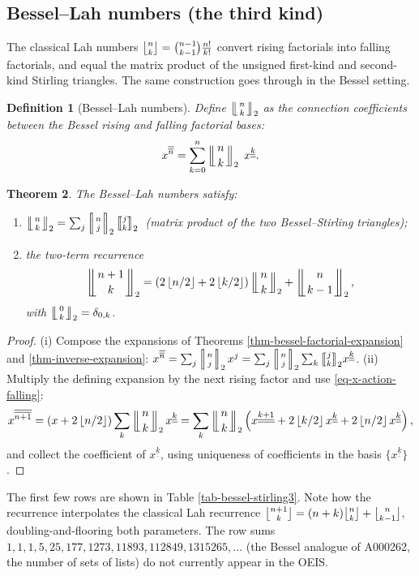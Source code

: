 \documentclass[a4paper]{amsart}
\numberwithin{equation}{section}
\newcommand{\Lah}[0]{\genfrac{\lfloor}{\rfloor}{0pt}{}}
\newcommand{\mStirling}[0]{\genfrac{\llbracket}{\rrbracket}{0pt}{}}
\newcommand{\mStirlingone}[2]{\left[\mkern-3.8mu\middle|\genfrac{}{}{0pt}{}{#1}{#2}\middle|\mkern-3.8mu\right]}
\newcommand{\mLah}[2]{\left\lfloor\mkern-5.5mu\left\lfloor\genfrac{}{}{0pt}{}{#1}{#2}\right\rfloor\mkern-5.5mu\right\rfloor}
\newcommand{\uuline}[1]{\underline{\underline{#1}}}
\newcommand{\ooline}[1]{\overline{\overline{#1}}}
\newcommand{\floor}[1]{\left\lfloor #1 \right\rfloor}
\newtheorem{theorem}{Theorem}[section]
\newtheorem{definition}[theorem]{Definition}
\begin{document}
\subsection{Bessel--Lah numbers (the third kind)}

The classical Lah numbers $\Lah{n}{k} = \binom{n-1}{k-1}\frac{n!}{k!}$ convert rising factorials into falling factorials, and equal the matrix product of the unsigned first-kind and second-kind Stirling triangles. The same construction goes through in the Bessel setting.

\begin{definition}[Bessel--Lah numbers]
Define $\mLah{n}{k}_2$ as the connection coefficients between the Bessel rising and falling factorial bases:
\[
x^{\ooline{n}} = \sum_{k=0}^n \mLah{n}{k}_2\; x^{\uuline{k}}.
\]
\end{definition}

\begin{theorem}\label{thm-bessel-lah}
The Bessel--Lah numbers satisfy:
\begin{enumerate}
    \item[(i)] $\mLah{n}{k}_2 = \sum_{j} \mStirlingone{n}{j}_2 \mStirling{j}{k}_2$ \,(matrix product of the two Bessel--Stirling triangles);
    \item[(ii)] the two-term recurrence
    \[
    \mLah{n+1}{k}_2 = \left(2\floor{n/2} + 2\floor{k/2}\right)\mLah{n}{k}_2 + \mLah{n}{k-1}_2,
    \]
    with $\mLah{0}{k}_2 = \delta_{0,k}$.
\end{enumerate}
\end{theorem}
\begin{proof}
(i) Compose the expansions of Theorems \ref{thm-bessel-factorial-expansion} and \ref{thm-inverse-expansion}: $x^{\ooline{n}} = \sum_j \mStirlingone{n}{j}_2 x^j = \sum_j \mStirlingone{n}{j}_2 \sum_k \mStirling{j}{k}_2 x^{\uuline{k}}$.
(ii) Multiply the defining expansion by the next rising factor and use \eqref{eq-x-action-falling}:
\[
x^{\ooline{n+1}} = \left(x + 2\floor{n/2}\right)\sum_k \mLah{n}{k}_2 x^{\uuline{k}}
= \sum_k \mLah{n}{k}_2 \left( x^{\uuline{k+1}} + 2\floor{k/2}x^{\uuline{k}} + 2\floor{n/2}x^{\uuline{k}}\right),
\]
and collect the coefficient of $x^{\uuline{k}}$, using uniqueness of coefficients in the basis $\{x^{\uuline{k}}\}$.
\end{proof}

The first few rows are shown in Table \ref{tab-bessel-stirling3}. Note how the recurrence interpolates the classical Lah recurrence $\Lah{n+1}{k} = (n+k)\Lah{n}{k} + \Lah{n}{k-1}$, doubling-and-flooring both parameters. The row sums $1, 1, 1, 5, 25, 177, 1273, 11893, 112849, 1315265, \ldots$ (the Bessel analogue of A000262, the number of sets of lists) do not currently appear in the OEIS.
\end{document}
